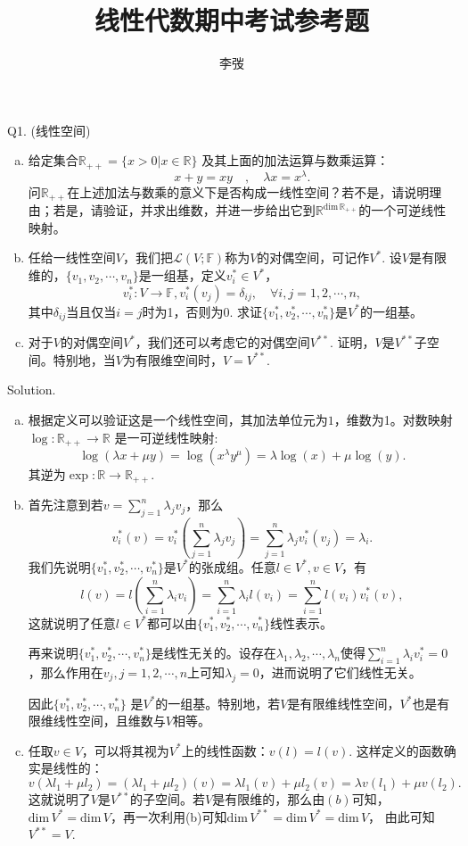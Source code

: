 \documentclass[12pt]{article}
\title{\bf 线性代数期中考试参考题}
\author{李弢}
\date{}
\begin{document}
\maketitle
\noindent{} Q1. (线性空间)
\begin{enumerate}[(a)]
\item 给定集合$\mathbb{R}_{++}=\{x>0|x\in\mathbb{R}\}$ 及其上面的加法运算与数乘运算：
\[x+y = xy\quad, \quad\lambda x= x^{\lambda}.\]
问$\mathbb{R}_{++}$在上述加法与数乘的意义下是否构成一线性空间？若不是，请说明理由；若是，请验证，并求出维数，并进一步给出它到$\mathbb{R}^{\mathrm{dim}\, \mathbb{R}_{++}}$的一个可逆线性映射。
\item 任给一线性空间$V$，我们把$\mathcal{L}(V;\mathbb{F})$称为$V$的对偶空间，可记作$V^*$. 设$V$是有限维的，$\{v_1,v_2,\cdots,v_n\}$是一组基，定义$v_i^*\in V^*$，
\[v_i^*:V\rightarrow \mathbb{F}, v_i^*(v_j) = \delta_{ij},\quad\forall i,j=1,2,\cdots,n,\]
其中$\delta_{ij}$当且仅当$i=j$时为1，否则为0. 求证$\{v_1^*,v_2^*,\cdots,v_n^*\}$是$V^*$的一组基。
\item 对于$V$的对偶空间$V^*$，我们还可以考虑它的对偶空间$V^{**}$. 证明，$V$是$V^{**}$子空间。特别地，当$V$为有限维空间时，$V=V^{**}$. 
\end{enumerate}

\noindent{} Solution.
\begin{enumerate}[(a)]
\item 根据定义可以验证这是一个线性空间，其加法单位元为$1$，维数为1。对数映射$\log:\mathbb{R}_{++}\rightarrow \mathbb{R}$ 是一可逆线性映射:
\[\log(\lambda x+\mu y) =\log(x^{\lambda}y^{\mu})=\lambda \log(x)+\mu\log(y).\]
其逆为$\exp: \mathbb{R}\rightarrow\mathbb{R}_{++}$.

\item 首先注意到若$v=\sum_{j=1}^n\lambda_j v_j$，那么
\[v_i^*(v) = v_i^*(\sum_{j=1}^n\lambda_j v_j)=\sum_{j=1}^n\lambda_j v_i^*(v_j)=\lambda_i.\]
我们先说明$\{v_1^*,v_2^*,\cdots,v_n^*\}$是$V^*$的张成组。任意$l \in V^*, v\in V$，有
\[l(v) = l(\sum_{i=1}^n \lambda_i v_i) = \sum_{i=1}^n\lambda_i l (v_i) =  \sum_{i=1}^n l (v_i) v_i^*(v),\]
这就说明了任意$l \in V^*$都可以由$\{v_1^*,v_2^*,\cdots,v_n^*\}$线性表示。

再来说明$\{v_1^*,v_2^*,\cdots,v_n^*\}$是线性无关的。设存在$\lambda_1,\lambda_2,\cdots,\lambda_n$使得$\sum_{i=1}^n\lambda_i v_i^*=0$，那么作用在$v_j,j=1,2,\cdots,n$上可知$\lambda_j=0$，进而说明了它们线性无关。

因此$\{v_1^*,v_2^*,\cdots,v_n^*\}$ 是$V^*$的一组基。特别地，若$V$是有限维线性空间，$V^*$也是有限维线性空间，且维数与$V$相等。

\item 任取$v\in V$，可以将其视为$V^*$上的线性函数：$v(l) = l(v)$. 这样定义的函数确实是线性的：
\[v(\lambda l_1+\mu l_2) = (\lambda l_1+\mu l_2)(v) = \lambda l_1(v)+\mu l_2(v)=\lambda v(l_1)+\mu v(l_2).\] 
这就说明了$V$是$V^{**}$的子空间。若$V$是有限维的，那么由$(b)$可知，$\mathrm{dim}\, V^* = \mathrm{dim}\, V$，再一次利用(b)可知$\mathrm{dim}\, V^{**}=\mathrm{dim}\, V^* = \mathrm{dim}\,V$， 由此可知$V^{**}=V$.
\end{enumerate} 
\end{document}
